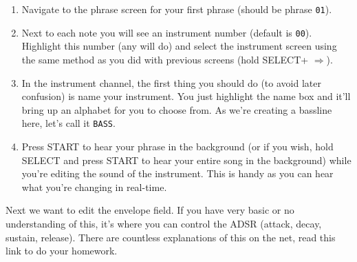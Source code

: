 \documentclass[]{article}
\newcommand{\buttonStyle}[1]{\textsf{#1}\xspace}
\newcommand{\buttonSymbolStyle}[1]{$\bm{#1}$\xspace}
\newcommand{\bStart}{\buttonStyle{{START}}}
\newcommand{\bSelect}{\buttonStyle{{SELECT}}}
\newcommand{\bRight}{\buttonSymbolStyle{\Rightarrow}}
\newcommand{\nb}[1]{\texttt{#1}\xspace}
\begin{document}
\begin{enumerate}
	
\item Navigate to the phrase screen for your first phrase (should be phrase \nb{01}).

\item Next to each note you will see an instrument number (default is \nb{00}). Highlight this number (any will do) and select the instrument screen using the same method as you did with previous screens (hold \bSelect + \bRight).

\item In the instrument channel, the first thing you should do (to avoid later confusion) is name your instrument. You just highlight the name box and it'll bring up an alphabet for you to choose from. As we're creating a bassline here, let's call it \nb{BASS}.

\item Press \bStart to hear your phrase in the background (or if you wish, hold \bSelect and press \bStart to hear your entire song in the background) while you're editing the sound of the instrument. This is handy as you can hear what you're changing in real-time.

\end{enumerate}

Next we want to edit the envelope field. If you have very basic or no understanding of this, it's where you can control the ADSR (attack, decay, sustain, release). There are countless explanations of this on the net, read this link to do your homework.
\end{document}

